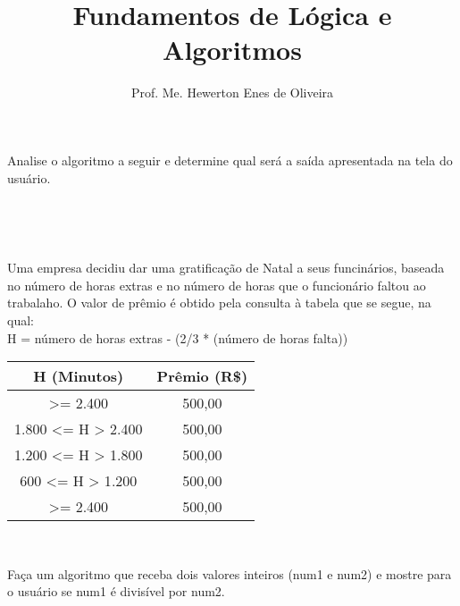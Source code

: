 \documentclass[exam]{IFCExams}
\title{Fundamentos de Lógica e Algoritmos}
\author{Prof. Me. Hewerton Enes de Oliveira}
\begin{document}
  
  \begin{exeenv}{3}
    Analise o algoritmo a seguir e determine qual será a saída apresentada na tela do usuário.
  
    \begin{algorithm}[H]
    \end{algorithm}
    ~\newline
  \end{exeenv}
  
  
  
  ~\newline
  
  \begin{exeenv}{4}
  Uma empresa decidiu dar uma gratificação de Natal a seus funcinários, baseada no número de horas extras e no número de horas que o funcionário
  faltou ao trabalaho. O valor de prêmio é obtido pela consulta à tabela que se segue, na qual: \\ H = número de horas extras - (2/3 * (número de horas falta))
  
  
    \begin{center}
      \begin{tabular}[!h]{| c | c|}
	\hline
	H (Minutos) & Prêmio (R\$) \\ 
	\hline
	>= 2.400 & 500,00\\ 
	\hline
	1.800 <= H > 2.400  & 500,00\\ 
	\hline
	1.200 <= H > 1.800 & 500,00\\ 
	\hline
	600 <= H > 1.200 & 500,00\\ 
	\hline
	>= 2.400 & 500,00\\ 
	\hline
    
      \end{tabular} 
    
    \end{center}
    ~\newline
  \end{exeenv}
 
  \begin{exeenv}{3}
    Faça um algoritmo que receba dois valores inteiros (num1 e num2) e mostre para o usuário se num1 é divisível por num2.
  \end{exeenv}


  
\end{document}
